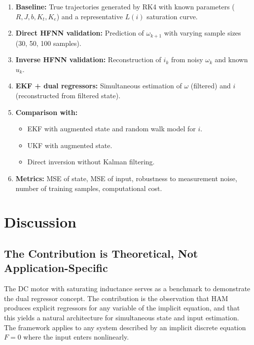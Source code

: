 \documentclass[lettersize,journal]{IEEEtran}
\begin{document}
\begin{enumerate}
    \item \textbf{Baseline:} True trajectories generated by RK4 with known parameters ($R, J, b, K_t, K_e$) and a representative $L(i)$ saturation curve.
    \item \textbf{Direct HFNN validation:} Prediction of $\omega_{k+1}$ with varying sample sizes (30, 50, 100 samples).
    \item \textbf{Inverse HFNN validation:} Reconstruction of $i_k$ from noisy $\omega_k$ and known $u_k$.
    \item \textbf{EKF + dual regressors:} Simultaneous estimation of $\omega$ (filtered) and $i$ (reconstructed from filtered state).
    \item \textbf{Comparison with:}
    \begin{itemize}
        \item EKF with augmented state and random walk model for $i$.
        \item UKF with augmented state.
        \item Direct inversion without Kalman filtering.
    \end{itemize}
    \item \textbf{Metrics:} MSE of state, MSE of input, robustness to measurement noise, number of training samples, computational cost.
\end{enumerate}

\section{Discussion}
\label{sec:discussion}

\subsection{The Contribution is Theoretical, Not Application-Specific}

The DC motor with saturating inductance serves as a benchmark to demonstrate the dual regressor concept. The contribution is the observation that HAM produces explicit regressors for any variable of the implicit equation, and that this yields a natural architecture for simultaneous state and input estimation. The framework applies to any system described by an implicit discrete equation $F = 0$ where the input enters nonlinearly.
\end{document}
